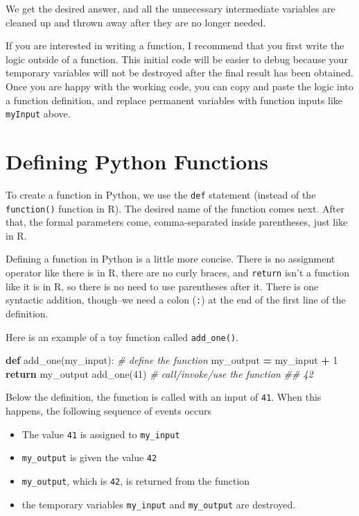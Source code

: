 \documentclass[
  12pt,
  krantz2]{krantz}
\makeatletter
\newenvironment{Shaded}{\begin{snugshade}}{\end{snugshade}}
\newcommand{\CommentTok}[1]{\textcolor[rgb]{0.37,0.37,0.37}{\textit{#1}}}
\newcommand{\ControlFlowTok}[1]{\textcolor[rgb]{0.27,0.27,0.27}{\textbf{#1}}}
\newcommand{\DecValTok}[1]{\textcolor[rgb]{0.06,0.06,0.06}{#1}}
\newcommand{\KeywordTok}[1]{\textcolor[rgb]{0.27,0.27,0.27}{\textbf{#1}}}
\newcommand{\NormalTok}[1]{#1}
\newcommand{\OperatorTok}[1]{\textcolor[rgb]{0.43,0.43,0.43}{\textbf{#1}}}
\providecommand{\tightlist}{%
  \setlength{\itemsep}{0pt}\setlength{\parskip}{0pt}}
\newenvironment{kframe}{%
\medskip{}
\setlength{\fboxsep}{.8em}
 \def\at@end@of@kframe{}%
 \ifinner\ifhmode%
  \def\at@end@of@kframe{\end{minipage}}%
  \begin{minipage}{\columnwidth}%
 \fi\fi%
 \def\FrameCommand##1{\hskip\@totalleftmargin \hskip-\fboxsep
 \colorbox{shadecolor}{##1}\hskip-\fboxsep
     \hskip-\linewidth \hskip-\@totalleftmargin \hskip\columnwidth}%
 \MakeFramed {\advance\hsize-\width
   \@totalleftmargin\z@ \linewidth\hsize
   \@setminipage}}%
 {\par\unskip\endMakeFramed%
 \at@end@of@kframe}
\renewenvironment{Shaded}{\begin{kframe}}{\end{kframe}}
\makeatother
\begin{document}
We get the desired answer, and all the unnecessary intermediate variables are cleaned up and thrown away after they are no longer needed.

If you are interested in writing a function, I recommend that you first write the logic outside of a function. This initial code will be easier to debug because your temporary variables will not be destroyed after the final result has been obtained. Once you are happy with the working code, you can copy and paste the logic into a function definition, and replace permanent variables with function inputs like \texttt{myInput} above.

\hypertarget{defining-python-functions}{%
\section{Defining Python Functions}\label{defining-python-functions}}

To create a function in Python, we use the \texttt{def} statement (instead of the \texttt{function()} function in R). The desired name of the function comes next. After that, the formal parameters come, comma-separated inside parentheses, just like in R.

Defining a function in Python is a little more concise. There is no assignment operator like there is in R, there are no curly braces, and \texttt{return} isn't a function like it is in R, so there is no need to use parentheses after it. There is one syntactic addition, though--we need a colon (\texttt{:}) at the end of the first line of the definition.

Here is an example of a toy function called \texttt{add\_one()}.

\begin{Shaded}
\begin{Highlighting}[]
\KeywordTok{def}\NormalTok{ add\_one(my\_input):  }\CommentTok{\# define the function}
\NormalTok{  my\_output }\OperatorTok{=}\NormalTok{ my\_input }\OperatorTok{+} \DecValTok{1}
  \ControlFlowTok{return}\NormalTok{ my\_output}
\NormalTok{add\_one(}\DecValTok{41}\NormalTok{) }\CommentTok{\# call/invoke/use the function }
\CommentTok{\#\# 42}
\end{Highlighting}
\end{Shaded}

Below the definition, the function is called with an input of \texttt{41}. When this happens, the following sequence of events occurs

\begin{itemize}
\tightlist
\item
  The value \texttt{41} is assigned to \texttt{my\_input}
\item
  \texttt{my\_output} is given the value \texttt{42}
\item
  \texttt{my\_output}, which is \texttt{42}, is returned from the function
\item
  the temporary variables \texttt{my\_input} and \texttt{my\_output} are destroyed.
\end{itemize}
\end{document}
